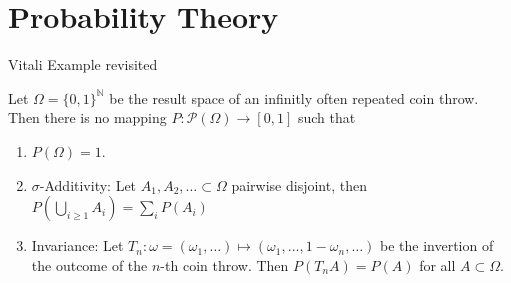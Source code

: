 \documentclass[compress]{beamer}
\newcommand{\NN}{\mathbb{N}}
\newcommand{\td}{\,\mathrm{d}}  %
\begin{document}

\section{Probability Theory}

\begin{frame}{Vitali Example revisited}
  \begin{theorem}
    Let $\Omega=\{0,1\}^\NN$ be the result space of an infinitly often repeated
    coin throw. Then there is no mapping $P: \mathcal{P}(\Omega) \to [0,1]$ such
    that
    \begin{enumerate}
    \item $P(\Omega)=1$.
    \item $\sigma$-Additivity: Let $A_1, A_2, \dots \subset \Omega$ pairwise
      disjoint, then
      $P(\bigcup_{i\geq 1} A_i) = \sum_i P(A_i)
      $
    \item Invariance: Let $T_n: \omega = (\omega_1, \dots) \mapsto (\omega_1,
      \dots, 1-\omega_n, \dots)$ be the invertion of the outcome of the $n$-th
      coin throw. Then $P(T_nA)=P(A)$ for all $A \subset \Omega$.
    \end{enumerate}
  \end{theorem}
\end{frame}
\end{document}
